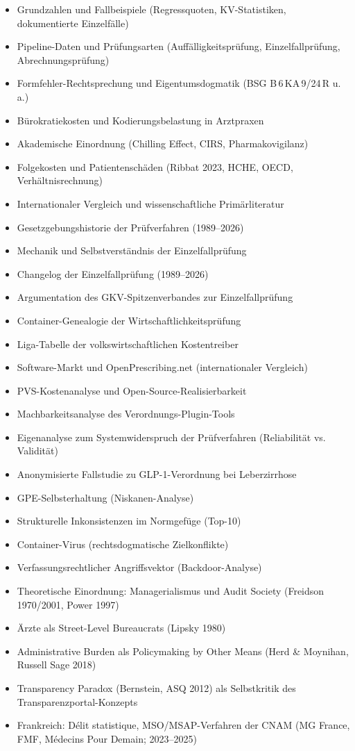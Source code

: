 \documentclass{umbruch-position}
\begin{document}
\begin{itemize}[nosep]
  \item Grundzahlen und Fallbeispiele (Regressquoten, KV-Statistiken, dokumentierte Einzelfälle)
  \item Pipeline-Daten und Prüfungsarten (Auffälligkeitsprüfung, Einzelfallprüfung, Abrechnungsprüfung)
  \item Formfehler-Rechtsprechung und Eigentumsdogmatik (BSG B\,6\,KA\,9/24\,R u.\,a.)
  \item Bürokratiekosten und Kodierungsbelastung in Arztpraxen
  \item Akademische Einordnung (Chilling Effect, CIRS, Pharmakovigilanz)
  \item Folgekosten und Patientenschäden (Ribbat 2023, HCHE, OECD, Verhältnisrechnung)
  \item Internationaler Vergleich und wissenschaftliche Primärliteratur
  \item Gesetzgebungshistorie der Prüfverfahren (1989--2026)
  \item Mechanik und Selbstverständnis der Einzelfallprüfung
  \item Changelog der Einzelfallprüfung (1989--2026)
  \item Argumentation des GKV-Spitzenverbandes zur Einzelfallprüfung
  \item Container-Genealogie der Wirtschaftlichkeitsprüfung
  \item Liga-Tabelle der volkswirtschaftlichen Kostentreiber
  \item Software-Markt und OpenPrescribing.net (internationaler Vergleich)
  \item PVS-Kostenanalyse und Open-Source-Realisierbarkeit
  \item Machbarkeitsanalyse des Verordnungs-Plugin-Tools
  \item Eigenanalyse zum Systemwiderspruch der Prüfverfahren (Reliabilität vs. Validität)
  \item Anonymisierte Fallstudie zu GLP-1-Verordnung bei Leberzirrhose
  \item GPE-Selbsterhaltung (Niskanen-Analyse)
  \item Strukturelle Inkonsistenzen im Normgefüge (Top-10)
  \item Container-Virus (rechtsdogmatische Zielkonflikte)
  \item Verfassungsrechtlicher Angriffsvektor (Backdoor-Analyse)
  \item Theoretische Einordnung: Managerialismus und Audit Society (Freidson 1970/2001, Power 1997)
  \item Ärzte als Street-Level Bureaucrats (Lipsky 1980)
  \item Administrative Burden als Policymaking by Other Means (Herd \& Moynihan, Russell Sage 2018)
  \item Transparency Paradox (Bernstein, ASQ 2012) als Selbstkritik des Transparenzportal-Konzepts
  \item Frankreich: D\'elit statistique, MSO/MSAP-Verfahren der CNAM (MG France, FMF, Médecins Pour Demain; 2023--2025)
\end{itemize}
\end{document}
